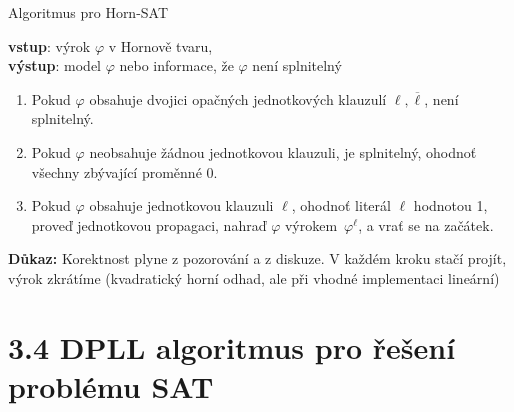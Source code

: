 \documentclass{beamer}
\begin{document}
\begin{frame}{Algoritmus pro Horn-SAT}

    \textbf{vstup}: výrok $\varphi$ v Hornově tvaru,\\ \textbf{výstup}: model $\varphi$ nebo informace, že $\varphi$ není splnitelný
    \begin{enumerate}
        \item Pokud $\varphi$ obsahuje dvojici opačných jednotkových klauzulí $\ell,\overline{\ell}$, není splnitelný.
        \item Pokud $\varphi$ neobsahuje žádnou jednotkovou klauzuli, je splnitelný, ohodnoť všechny zbývající proměnné 0.
        \item Pokud $\varphi$ obsahuje jednotkovou klauzuli $\ell$, ohodnoť literál $\ell$ hodnotou 1, proveď jednotkovou propagaci, nahraď $\varphi$ výrokem~$\varphi^\ell$, a vrať se na začátek.
    \end{enumerate}


    \textbf{Důkaz:} {\small Korektnost plyne z pozorování a z diskuze. V každém kroku stačí projít, výrok zkrátíme (kvadratický horní odhad, ale při vhodné implementaci lineární)}\hfill\qedsymbol

\end{frame}


\section{3.4 DPLL algoritmus pro řešení problému SAT}
\end{document}
